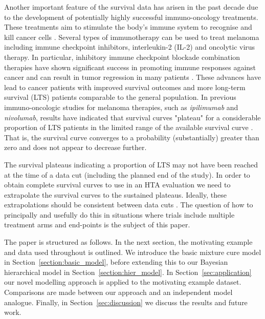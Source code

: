 \documentclass[AMA,STIX1COL]{WileyNJD-v2}
\begin{document}
Another important feature of the survival data has arisen in the past decade due to the development of potentially highly successful immuno-oncology treatments.
These treatments aim to stimulate the body’s immune system to recognise and kill cancer cells \cite{Ouwens2019}. Several types of immunotherapy can be used to treat melanoma including immune checkpoint inhibitors, interleukin-2 (IL-2) and oncolytic virus therapy.
In particular, inhibitory immune checkpoint blockade combination therapies have shown significant success in promoting immune responses against cancer and can result in tumor regression in many patients \cite{Khair2019}.
These advances have lead to cancer patients with improved survival outcomes and more long-term survival (LTS) patients comparable to the general population.
In previous immuno-oncologic studies for melanoma therapies, such as {\it ipilimumab} and {\it nivolumab},
results have indicated that survival curves "plateau" for a considerable proportion of LTS patients in the limited range of the available survival curve \citep{Wolchok2017, Larkin2019}.
That is, the survival curve converges to a probability (substantially) greater than zero and does not appear to decrease further.


The survival plateaus indicating a proportion of LTS may not have been reached at the time of a data cut (including the planned end of the study).
In order to obtain complete survival curves to use in an HTA evaluation we need to extrapolate the survival curves to the sustained plateaus.
Ideally, these extrapolations should be consistent between data cuts \citep{Bullement2020}.
The question of how to principally and usefully do this in situations where trials include multiple treatment arms and end-points is the subject of this paper.

The paper is structured as follows.
In the next section, the motivating example and data used throughout is outlined.
We introduce the basic mixture cure model in Section~\ref{section:basic_model}, before extending this to our Bayesian hierarchical model in Section~\ref{section:hier_model}.
In Section~\ref{sec:application} our novel modelling approach is applied to the motivating example dataset.
Comparisons are made between our approach and an independent model analogue.
Finally, in Section~\ref{sec:discussion} we discuss the results and future work.
\end{document}
